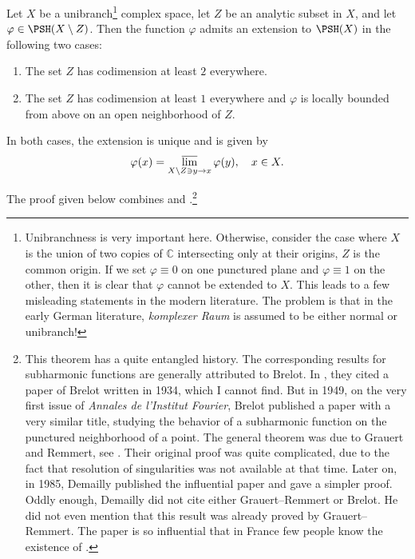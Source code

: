 \begin{theorem}\label{thm:GRexten2}
Let $X$ be a unibranch\footnote{Unibranchness is very important here. Otherwise, consider the case where $X$ is the union of two copies of $\mathbb{C}$ intersecting only at their origins, $Z$ is the common origin. If we set $\varphi\equiv 0$ on one punctured plane and $\varphi\equiv 1$ on the other, then it is clear that $\varphi$ cannot be extended to $X$. This leads to a few misleading statements in the modern literature. The problem is that in the early German literature, \emph{komplexer Raum} is assumed to be either normal or unibranch!} complex space, let $Z$ be an analytic subset in $X$, and let $\varphi\in \PSH(X\setminus Z)$. Then the function $\varphi$ admits an extension to $\PSH(X)$ in the following two cases:
    \begin{enumerate}
        \item\label{itm:thm:GRexten2:1} The set $Z$ has codimension at least $2$ everywhere.
        \item\label{itm:thm:GRexten2:2} The set $Z$ has codimension at least $1$ everywhere and $\varphi$ is locally bounded from above on an open neighborhood of $Z$.
    \end{enumerate}
    In both cases, the extension is unique and is given by
    \begin{equation}\label{eq:GRextvarphi}
    \varphi(x)=\varlimsup_{X\setminus Z\ni y\to x}\varphi(y),\quad x\in X.
    \end{equation}
\end{theorem}
The proof given below combines \cite[Théorème~1.7]{Dem85} and \cite{GR56}.\footnote{This theorem has a quite entangled history. The corresponding results for subharmonic functions are generally attributed to Brelot. In \cite{GR56}, they cited a paper of Brelot written in 1934, which I cannot find. But in 1949, on the very first issue of \emph{Annales de l'Institut Fourier}, Brelot published a paper \cite{Bre49} with a very similar title, studying the behavior of a subharmonic function on the punctured neighborhood of a point. The general theorem was due to Grauert and Remmert, see \cite{GR56}. Their original proof was quite complicated, due to the fact that resolution of singularities was not available at that time. Later on, in 1985, Demailly published the influential paper \cite{Dem85} and gave a simpler proof. Oddly enough, Demailly did not cite either Grauert--Remmert or Brelot. He did not even mention that this result was already proved by Grauert--Remmert. The paper \cite{Dem85} is so influential that in France few people know the existence of \cite{GR56}.}

